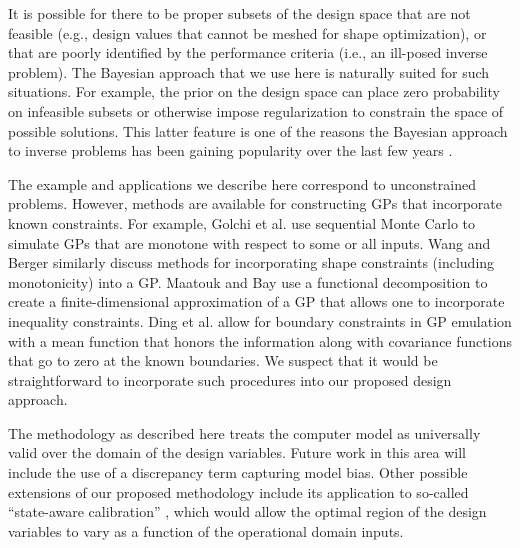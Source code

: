 \documentclass[twocolumn,10pt]{asme2ej}
\begin{document}
It is possible for there to be proper subsets of the design space that are not feasible (e.g., design values that cannot be meshed for shape optimization), or that are poorly identified by the performance criteria (i.e., an ill-posed inverse problem). The Bayesian approach that we use here is naturally suited for such situations. For example, the prior on the design space can place zero probability on infeasible subsets or otherwise impose regularization to constrain the space of possible solutions. This latter feature is one of the reasons the Bayesian approach to inverse problems has been gaining popularity over the last few years \cite{Calvetti2014}.

%

The example and applications we describe here correspond to unconstrained problems. However, methods are available for constructing GPs that incorporate known constraints. For example, Golchi et al. \cite{Golchi2015} use sequential Monte Carlo to simulate GPs that are monotone with respect to some or all inputs. Wang and Berger \cite{Wang2016} similarly discuss methods for incorporating shape constraints (including monotonicity) into a GP. Maatouk and Bay \cite{Maatouk2017} use a functional decomposition to create a finite-dimensional approximation of a GP that allows one to incorporate inequality constraints.  Ding et al. \cite{DingEtAl19} allow for boundary constraints in GP emulation with a mean function that honors the information along with covariance functions that go to zero at the known boundaries. We suspect that it would be straightforward to incorporate such procedures into our proposed design approach.

%
The methodology as described here treats the computer model as universally valid over the domain of the design variables. 
%
Future work in this area will include the use of a discrepancy term capturing model bias.
%
%
Other possible extensions of our proposed methodology include its application to so-called ``state-aware calibration'' \cite{Atamturktur2015,Stevens2018,Brown2016}, which would allow the optimal region of the design variables to vary as a function of the operational domain inputs.
\end{document}
